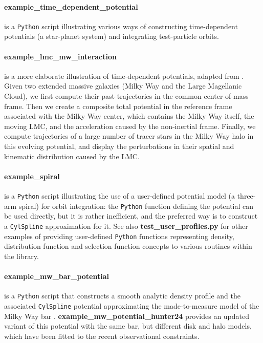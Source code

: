 \documentclass[12pt]{article}
\newcommand{\Python}{\texttt{Python}\xspace}
\newcommand{\ppp}[1]{\textcolor{darkolive} {\texttt{#1}}}
\let\oldparagraph\paragraph
\renewcommand{\paragraph}[1]{\vspace{-2mm}\oldparagraph{#1}}
\begin{document}
\paragraph{example_time_dependent_potential} is a \Python script illustrating various ways of constructing time-dependent potentials (a star-planet system) and integrating test-particle orbits.

\paragraph{example_lmc_mw_interaction} is a more elaborate illustration of time-dependent potentials, adapted from \cite{Vasiliev2021}. Given two extended massive galaxies (Milky Way and the Large Magellanic Cloud), we first compute their past trajectories in the common center-of-mass frame. Then we create a composite total potential in the reference frame associated with the Milky Way center, which contains the Milky Way itself, the moving LMC, and the acceleration caused by the non-inertial frame. Finally, we compute trajectories of a large number of tracer stars in the Milky Way halo in this evolving potential, and display the perturbations in their spatial and kinematic distribution caused by the LMC. 

\paragraph{example_spiral} \label{sec:ExampleSpiral} is a \Python script illustrating the use of a user-defined potential model (a three-arm spiral) for orbit integration: the \Python function defining the potential can be used directly, but it is rather inefficient, and the preferred way is to construct a \ppp{CylSpline} approximation for it. See also \textbf{test\_user\_profiles.py} for other examples of providing user-defined \Python functions representing density, distribution function and selection function concepts to various routines within the library.

\paragraph{example_mw_bar_potential} is a \Python script that constructs a smooth analytic density profile \cite{Sormani2022b} and the associated \ppp{CylSpline} potential approximating the made-to-measure model of the Milky Way bar \cite{Portail2017}.
\textbf{example_mw_potential_hunter24} provides an updated variant of this potential \cite{Hunter2024} with the same bar, but different disk and halo models, which have been fitted to the recent observational constraints.
\end{document}
